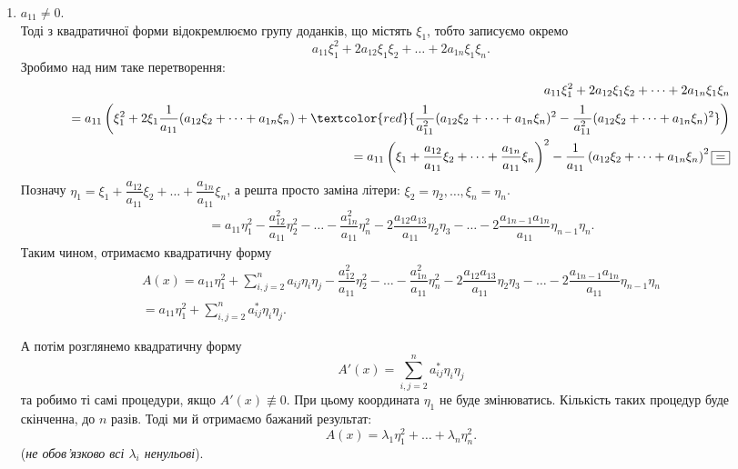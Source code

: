 \documentclass{math_library}
\begin{document}
\begin{enumerate}[wide=0pt,label={\Roman*.}]
\item $a_{11} \neq 0$. \\
Тоді з квадратичної форми відокремлюємо групу доданків, що містять $\xi_1$, тобто записуємо окремо 
\[
a_{11}\xi_1^2 + 2a_{12} \xi_1 \xi_2 + \dots + 2a_{1n} \xi_1 \xi_n.
\]
Зробимо над ним таке перетворення:
\begin{align*}
a_{11}\xi_1^2 + 2a_{12} \xi_1 \xi_2 + \dots + 2a_{1n} \xi_1 \xi_n \\
= a_{11} \left( \xi_1^2 + 2 \xi_1 \dfrac{1}{a_{11}} (a_{12} \xi_2 + \dots + a_{1n} \xi_n) + \textcolor{red}{\dfrac{1}{a_{11}^2} (a_{12} \xi_2 + \dots + a_{1n} \xi_n)^2 - \dfrac{1}{a_{11}^2} (a_{12} \xi_2 + \dots + a_{1n} \xi_n)^2} \right) \\
= a_{11} \left( \xi_1 + \dfrac{a_{12}}{a_{11}} \xi_2 + \dots + \dfrac{a_{1n}}{a_{11}} \xi_n \right)^2 - \dfrac{1}{a_{11}} \left( a_{12} \xi_2 + \dots + a_{1n} \xi_n \right)^2 \boxed{=}
\end{align*}
Позначу $\eta_1 = \xi_1 + \dfrac{a_{12}}{a_{11}} \xi_2 + \dots + \dfrac{a_{1n}}{a_{11}} \xi_n$, а решта просто заміна літери: $\xi_2 = \eta_2, \dots, \xi_n = \eta_n$.
\begin{align*}
\boxed{=} a_{11}\eta_1^2 - \dfrac{a_{12}^2}{a_{11}} \eta_2^2 - \dots - \dfrac{a_{1n}^2}{a_{11}} \eta_n^2 - 2 \dfrac{a_{12} a_{13}}{a_{11}}\eta_2 \eta_3 - \dots - 2 \dfrac{a_{1 n-1} a_{1n}}{a_{11}} \eta_{n-1}\eta_n.
\end{align*}
Таким чином, отримаємо квадратичну форму
\begin{align*}
A(x) = a_{11}\eta_1^2 + \displaystyle\sum_{i,j=2}^n a_{ij} \eta_i \eta_j - \dfrac{a_{12}^2}{a_{11}} \eta_2^2 - \dots - \dfrac{a_{1n}^2}{a_{11}} \eta_n^2 - 2 \dfrac{a_{12} a_{13}}{a_{11}}\eta_2 \eta_3 - \dots - 2 \dfrac{a_{1 n-1} a_{1n}}{a_{11}} \eta_{n-1}\eta_n \\ = a_{11}\eta_1^2 + \displaystyle\sum_{i,j=2}^n a_{ij}^* \eta_i \eta_j.
\end{align*}

А потім розглянемо квадратичну форму 
\[
A'(x) = \sum_{i,j=2}^n a_{ij}^* \eta_i \eta_j
\]
та робимо ті самі процедури, якщо $A'(x) \not\equiv 0$. При цьому координата $\eta_1$ не буде змінюватись. Кількість таких процедур буде скінченна, до $n$ разів. Тоді ми й отримаємо бажаний результат:
\[
A(x) = \lambda_1 \eta_1^2 + \dots + \lambda_n \eta_n^2.
\]
(\textit{не обов'язково всі $\lambda_i$ ненульові}).
\end{enumerate}
\end{document}
